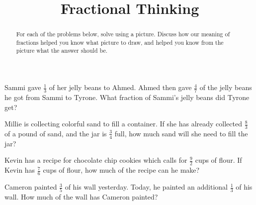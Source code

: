 \documentclass[handout,nooutcomes, noauthor]{ximera}
\title{Fractional Thinking}
\begin{document}
\begin{abstract}
For each of the problems below, solve using a picture. Discuss how our meaning of fractions helped you know what picture to draw, and helped you know from the picture what the answer should be.
\end{abstract}
\maketitle


\begin{problem}
Sammi gave $\frac{1}{3}$ of her jelly beans to Ahmed.  Ahmed then gave $\frac{4}{7}$ of the jelly beans he got from Sammi to Tyrone.  What fraction of Sammi's jelly beans did Tyrone get? \vfill
\end{problem}


\begin{problem}
Millie is collecting colorful sand to fill a container.  If she has already collected $\frac{8}{3}$ of a pound of sand, and the jar is $\frac{3}{4}$ full, how much sand will she need to fill the jar? \vfill
\end{problem}


\begin{problem}
Kevin has a recipe for chocolate chip cookies which calls for $\frac{9}{2}$ cups of flour.  If Kevin has $\frac{7}{6}$ cups of flour, how much of the recipe can he make? \vfill
\end{problem}


\begin{problem}
Cameron painted $\frac{3}{5}$ of his wall yesterday.  Today, he painted an additional $\frac{1}{3}$ of his wall. How much of the wall has Cameron painted? \vfill
\end{problem}
\end{document}
